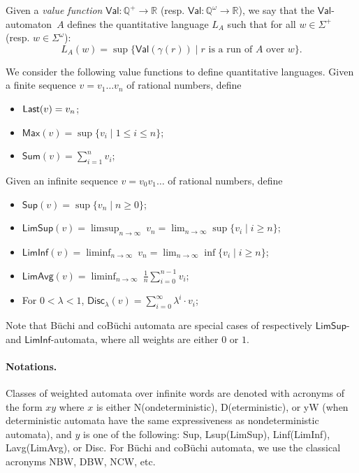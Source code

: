 \documentclass{llncs}
\newcommand{\rat}{{\mathbb Q}}
\newcommand{\real}{{\mathbb R}}
\newcommand{\Last}{{\sf Last}}
\newcommand{\La}{{\sc Lavg}}
\newcommand{\Li}{{\sc Linf}}
\newcommand{\Ls}{{\sc Lsup}}
\newcommand{\Di}{{\sc Disc}}
\newcommand{\nd}{\hspace{-2pt}{\sc 
\raisebox{2.0pt}{\scalebox{0.45}{\begin{tabular}{c}D\\[-2.8pt]N\end{tabular}}}\hspace{0pt}}yW
}
\newcommand{\Val}{\mathsf{Val}}
\newcommand{\Maxf}{\mathsf{Max}}
\newcommand{\Max}{\mathsf{Sup}}
\newcommand{\LimSup}{\mathsf{LimSup}}
\newcommand{\LimInf}{\mathsf{LimInf}}
\newcommand{\LimAvg}{\mathsf{LimAvg}}
\newcommand{\Disc}{\mathsf{Disc}}
\newcommand{\Sum}{\mathsf{Sum}}
\newcommand{\weight}{\gamma}
\begin{document}
Given a \emph{value function} $\Val: \rat^+ \to \real$ (resp. $\Val: \rat^{\omega} \to \real$), 
we say that the $\Val$-automaton~$A$ defines the quantitative language $L_A$ such 
that for all $w \in \Sigma^{+}$ (resp. $w \in \Sigma^{\omega}$):
$$L_A(w) = \sup \{\Val(\weight(r)) \mid r \text{ is a run of } A \text{ over } w\}.$$




We consider the following value functions to define quantitative languages.
Given a finite sequence $v= v_1 \dots v_n$ of rational numbers, define
\begin{itemize}
\item $\Last(v) = v_n$;
\item $\Maxf(v) = \sup \{v_i \mid 1 \leq i \leq n\}$;
\item $\Sum(v) = \displaystyle\sum_{i=1}^{n} v_i$;
\end{itemize}
Given an infinite sequence $v=v_0 v_1 \dots$ of rational numbers, define
\begin{itemize}
\item $\Max(v)    = \sup \{v_n \mid n \geq 0\}$;
\item $\LimSup(v) = \displaystyle\limsup_{n\to\infty} \ v_n = \lim_{n\to\infty} \sup \{v_i \mid i \geq n\}$;
\item $\LimInf(v) = \displaystyle\liminf_{n\to\infty} \ v_n = \lim_{n\to\infty} \inf \{v_i \mid i \geq n\}$;
\item $\LimAvg(v) = \displaystyle\liminf_{n\to\infty} \ \frac{1}{n} \sum_{i=0}^{n-1} v_i$;
\item For $0 < \lambda < 1$, $\Disc_{\lambda}(v) = \displaystyle \sum_{i=0}^{\infty} \lambda^i \cdot v_i$;
\end{itemize}

Note that B\"uchi and coB\"uchi automata are special cases of respectively 
$\LimSup$- and $\LimInf$-automata, where all weights are either $0$ or $1$.






\paragraph{\bf Notations.} Classes of weighted automata over infinite words are denoted 
with acronyms of the form 
$xy$ where $x$ is either {\sc N}(ondeterministic), {\sc D}(eterministic), 
or \nd(when deterministic automata have the same expressiveness as nondeterministic automata),
and $y$ is one of the following: {\sc Sup}, \Ls(LimSup), \Li(LimInf), \La(LimAvg), or \Di.
For B\"uchi and coB\"uchi automata, we use the classical acronyms NBW, DBW, NCW, etc.
\end{document}
